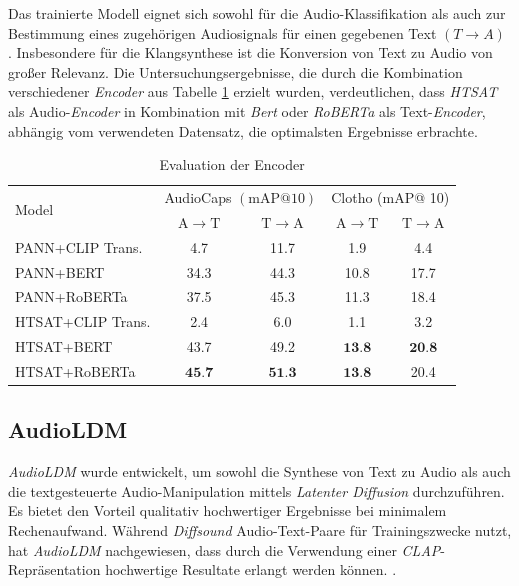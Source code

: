 \documentclass[
  a4paper,  %
  twoside,  %
  bibliography=totoc,
  headsepline,
  cleardoublepage=empty,
  parskip=half,
  draft=false
]{scrbook}
\begin{document}
Das trainierte Modell eignet sich sowohl für die Audio-Klassifikation als auch zur Bestimmung eines zugehörigen Audiosignals für einen gegebenen Text $(T\rightarrow A)$ \cite{wu_large-scale_2023}. Insbesondere für die Klangsynthese ist die Konversion von Text zu Audio von großer Relevanz. Die Untersuchungsergebnisse, die durch die Kombination verschiedener \emph{Encoder} aus Tabelle \ref{tab:Clap} erzielt wurden, verdeutlichen, dass \emph{HTSAT} \cite{chen_hts-at_2022} als Audio-\emph{Encoder} in Kombination mit \emph{Bert} \cite{devlin_bert_2019} oder \emph{RoBERTa} \cite{liu_roberta_2019} als Text-\emph{Encoder}, abhängig vom verwendeten Datensatz, die optimalsten Ergebnisse erbrachte. \cite{wu_large-scale_2023}

\begin{table}[h]
  \centering
\begin{tabular}{lcc|cc}
\hline \multirow{2}{*}{ Model } & \multicolumn{2}{c|}{ AudioCaps $(\mathrm{mAP} @ 10)$} & \multicolumn{2}{c}{ Clotho (mAP@ 10) } \\
\cline { 2 - 5 } & $\mathrm{A} \rightarrow \mathrm{T}$ & $\mathrm{T} \rightarrow \mathrm{A}$ & $\mathrm{A} \rightarrow \mathrm{T}$ & $\mathrm{T} \rightarrow \mathrm{A}$ \\
\hline PANN+CLIP Trans. & 4.7 & 11.7 & 1.9 & 4.4 \\
PANN+BERT & 34.3 & 44.3 & 10.8 & 17.7 \\
PANN+RoBERTa & 37.5 & 45.3 & 11.3 & 18.4 \\
HTSAT+CLIP Trans. & 2.4 & 6.0 & 1.1 & 3.2 \\
HTSAT+BERT & 43.7 & 49.2 & $\mathbf{1 3 . 8}$ & $\mathbf{2 0 . 8}$ \\
HTSAT+RoBERTa & $\mathbf{4 5 . 7}$ & $\mathbf{5 1 . 3}$ & $\mathbf{1 3 . 8}$ & 20.4 \\
\hline
\end{tabular}
\caption[Encoder CLAP]{Evaluation der Encoder \cite{wu_large-scale_2023}}
  \label{tab:Clap}
\end{table}

\subsection{AudioLDM}
\label{sec:AudioLDM}

\emph{AudioLDM} \cite{liu_audioldm_2023} wurde entwickelt, um sowohl die Synthese von Text zu Audio als auch die textgesteuerte Audio-Manipulation mittels \emph{Latenter Diffusion} \cite{rombach_high-resolution_2022} durchzuführen. Es bietet den Vorteil qualitativ hochwertiger Ergebnisse bei minimalem Rechenaufwand. Während \emph{Diffsound} \cite{yang_diffsound_2023} Audio-Text-Paare für Trainingszwecke nutzt, hat \emph{AudioLDM} nachgewiesen, dass durch die Verwendung einer \emph{CLAP}-Repräsentation \cite{wu_large-scale_2023} hochwertige Resultate erlangt werden können. \cite{liu_audioldm_2023}.
\end{document}
